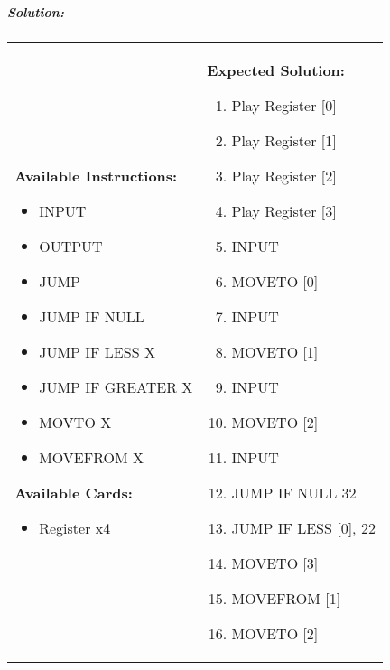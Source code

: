 \newpage
\subparagraph{Solution:} 
\begin{center}
    \begin{tabular}{ | m{5cm} | m{9cm} | } 
        \hline
            \textbf{Available Instructions:} 
            \begin{itemize}
                \setlength\itemsep{-.35em}
                \item INPUT
                \item OUTPUT
                \item JUMP
                \item JUMP IF NULL
                \item JUMP IF LESS X
                \item JUMP IF GREATER X
                \item MOVTO X
                \item MOVEFROM X
            \end{itemize}
            \textbf{Available Cards:} 
            \begin{itemize}
                \setlength\itemsep{-.35em}
                \item Register x4
            \end{itemize}& 
            \textbf{Expected Solution:} 
            \begin{enumerate}
                \setlength\itemsep{-.60em}
                \item Play Register [0]
                \item Play Register [1]
                \item Play Register [2]
                \item Play Register [3]
                \item INPUT
                \item MOVETO [0]
                \item INPUT
                \item MOVETO [1]
                \item INPUT
                \item MOVETO [2]
                \item INPUT
                \item JUMP IF NULL 32
                \item JUMP IF LESS [0], 22
                \item MOVETO [3]
                \item MOVEFROM [1]
                \item MOVETO [2]

\end{enumerate}
\end{tabular}
\end{center}
